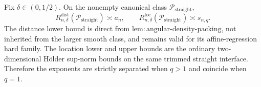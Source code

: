 Fix \(\delta\in(0,1/2)\). On the nonempty canonical class \(\mathcal{P}_{\mathrm{straight}}\), \[R_{n,\delta}^{\mathrm{dist}}(\mathcal{P}_{\mathrm{straight}})\asymp a_n,\qquad R_{n,\delta}^{\mathrm{loc}}(\mathcal{P}_{\mathrm{straight}})\asymp s_{n,q}.\] The distance lower bound is direct from \(\mathrm{lem:angular\text{-}density\text{-}packing}\), not inherited from the larger smooth class, and remains valid for its affine-regression hard family. The location lower and upper bounds are the ordinary two-dimensional H\"older sup-norm bounds on the same trimmed straight interface. Therefore the exponents are strictly separated when \(q>1\) and coincide when \(q=1\).